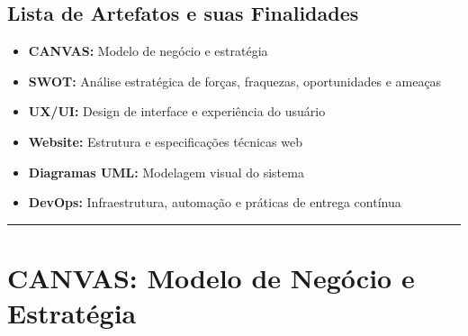\documentclass[11pt,a4paper]{article}
\begin{document}



\subsection*{Lista de Artefatos e suas Finalidades}

\begin{itemize}
    \item \textbf{CANVAS:} Modelo de negócio e estratégia
    \item \textbf{SWOT:} Análise estratégica de forças, fraquezas, oportunidades e ameaças
    \item \textbf{UX/UI:} Design de interface e experiência do usuário
    \item \textbf{Website:} Estrutura e especificações técnicas web
    \item \textbf{Diagramas UML:} Modelagem visual do sistema
    \item \textbf{DevOps:} Infraestrutura, automação e práticas de entrega contínua
\end{itemize}

\vspace{0.5cm}
\noindent\rule{\textwidth}{0.5pt}

\newpage



\section{CANVAS: Modelo de Negócio e Estratégia}
\end{document}
